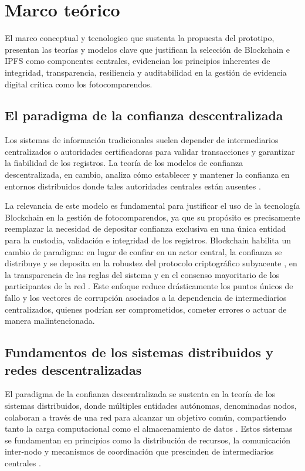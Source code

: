 \section{\large Marco teórico}
El marco conceptual y tecnologico que sustenta la propuesta del prototipo, presentan las teorías y modelos clave que justifican la selección de Blockchain e IPFS como componentes centrales, evidencian los principios inherentes de integridad, transparencia, resiliencia y auditabilidad en la gestión de evidencia digital crítica como los fotocomparendos.
\subsection{El paradigma de la confianza descentralizada}
Los sistemas de información tradicionales suelen depender de intermediarios centralizados o autoridades certificadoras para validar transacciones y garantizar la fiabilidad de los registros. La teoría de los modelos de confianza descentralizada, en cambio, analiza cómo establecer y mantener la confianza en entornos distribuidos donde tales autoridades centrales están ausentes \parencite{swan2015blockchain}.

La relevancia de este modelo es fundamental para justificar el uso de la tecnología Blockchain en la gestión de fotocomparendos, ya que su propósito es precisamente reemplazar la necesidad de depositar confianza exclusiva en una única entidad para la custodia, validación e integridad de los registros. Blockchain habilita un cambio de paradigma: en lugar de confiar en un actor central, la confianza se distribuye y se deposita en la robustez del protocolo criptográfico subyacente \parencite{nakamoto2008bitcoin}, en la transparencia de las reglas del sistema y en el consenso mayoritario de los participantes de la red \parencite{antonopoulos2023mastering}. Este enfoque reduce drásticamente los puntos únicos de fallo y los vectores de corrupción asociados a la dependencia de intermediarios centralizados, quienes podrían ser comprometidos, cometer errores o actuar de manera malintencionada.

\subsection{Fundamentos de los sistemas distribuidos y redes descentralizadas}
El paradigma de la confianza descentralizada se sustenta en la teoría de los sistemas distribuidos, donde múltiples entidades autónomas, denominadas nodos, colaboran a través de una red para alcanzar un objetivo común, compartiendo tanto la carga computacional como el almacenamiento de datos \parencite{vanSteen2017}. Estos sistemas se fundamentan en principios como la distribución de recursos, la comunicación inter-nodo y mecanismos de coordinación que prescinden de intermediarios centrales \parencite{coulouris2011}.


